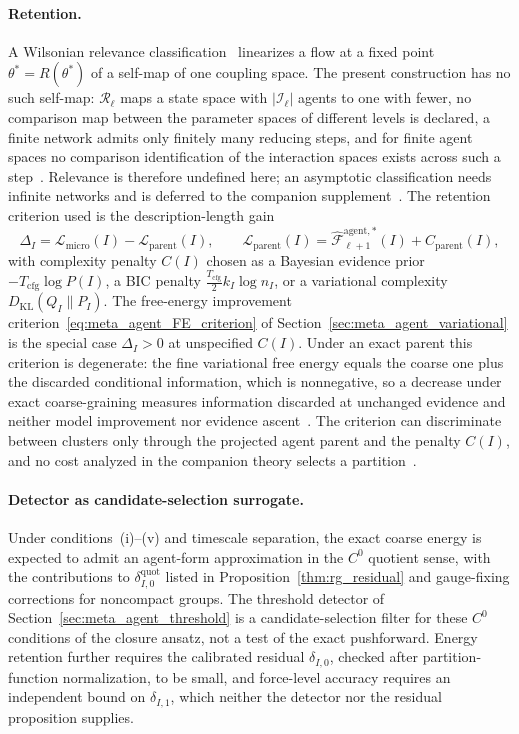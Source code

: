\documentclass[11pt]{article}
\begin{document}
\paragraph{Retention.}
A Wilsonian relevance classification~\cite{Wilson1971, Wilson1974} linearizes a flow at a fixed point $\theta^*=R(\theta^*)$ of a self-map of one coupling space. The present construction has no such self-map: $\mathcal{R}_\ell$ maps a state space with $|\mathcal{I}_\ell|$ agents to one with fewer, no comparison map between the parameter spaces of different levels is declared, a finite network admits only finitely many reducing steps, and for finite agent spaces no comparison identification of the interaction spaces exists across such a step~\cite[Ch.~11]{DennisGaugeVFE2026}. Relevance is therefore undefined here; an asymptotic classification needs infinite networks and is deferred to the companion supplement~\cite[Chs.~B5 and B6]{DennisGaugeVFESuppB2026}. The retention criterion used is the description-length gain~\cite{Schwarz1978, Rissanen1978}
\begin{equation}
\Delta_I = \mathcal{L}_{\mathrm{micro}}(I) - \mathcal{L}_{\mathrm{parent}}(I), \qquad \mathcal{L}_{\mathrm{parent}}(I) = \widehat{\mathcal{F}}_{\ell+1}^{\mathrm{agent},*}(I) + C_{\mathrm{parent}}(I),
\label{eq:rg_retention_gain}
\end{equation}
with complexity penalty $C(I)$ chosen as a Bayesian evidence prior $-T_{\mathrm{cfg}}\log P(I)$, a BIC penalty $\tfrac{T_{\mathrm{cfg}}}{2} k_I \log n_I$, or a variational complexity $D_{\mathrm{KL}}(Q_I \| P_I)$. The free-energy improvement criterion~\eqref{eq:meta_agent_FE_criterion} of Section~\ref{sec:meta_agent_variational} is the special case $\Delta_I > 0$ at unspecified $C(I)$. Under an exact parent this criterion is degenerate: the fine variational free energy equals the coarse one plus the discarded conditional information, which is nonnegative, so a decrease under exact coarse-graining measures information discarded at unchanged evidence and neither model improvement nor evidence ascent~\cite[Ch.~9]{DennisGaugeVFE2026}. The criterion can discriminate between clusters only through the projected agent parent and the penalty $C(I)$, and no cost analyzed in the companion theory selects a partition~\cite[Ch.~9]{DennisGaugeVFE2026}.

\paragraph{Detector as candidate-selection surrogate.}
Under conditions~(i)--(v) and timescale separation, the exact coarse energy is expected to admit an agent-form approximation in the $C^0$ quotient sense, with the contributions to $\delta_{I,0}^{\mathrm{quot}}$ listed in Proposition~\ref{thm:rg_residual} and gauge-fixing corrections for noncompact groups. The threshold detector of Section~\ref{sec:meta_agent_threshold} is a candidate-selection filter for these $C^0$ conditions of the closure ansatz, not a test of the exact pushforward. Energy retention further requires the calibrated residual $\delta_{I,0}$, checked after partition-function normalization, to be small, and force-level accuracy requires an independent bound on $\delta_{I,1}$, which neither the detector nor the residual proposition supplies.
\end{document}
